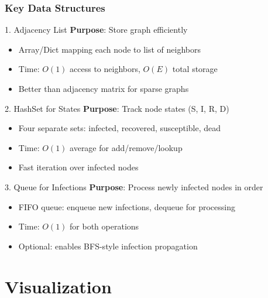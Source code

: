 \documentclass{beamer}
\begin{document}
\begin{frame}
\frametitle{Key Data Structures}

\begin{block}{1. Adjacency List}
\textbf{Purpose}: Store graph efficiently
\begin{itemize}
    \item Array/Dict mapping each node to list of neighbors
    \item Time: $O(1)$ access to neighbors, $O(E)$ total storage
    \item Better than adjacency matrix for sparse graphs
\end{itemize}
\end{block}

\begin{block}{2. HashSet for States}
\textbf{Purpose}: Track node states (S, I, R, D)
\begin{itemize}
    \item Four separate sets: infected, recovered, susceptible, dead
    \item Time: $O(1)$ average for add/remove/lookup
    \item Fast iteration over infected nodes
\end{itemize}
\end{block}

\begin{block}{3. Queue for Infections}
\textbf{Purpose}: Process newly infected nodes in order
\begin{itemize}
    \item FIFO queue: enqueue new infections, dequeue for processing
    \item Time: $O(1)$ for both operations
    \item Optional: enables BFS-style infection propagation
\end{itemize}
\end{block}
\end{frame}

\section{Visualization}
\end{document}
